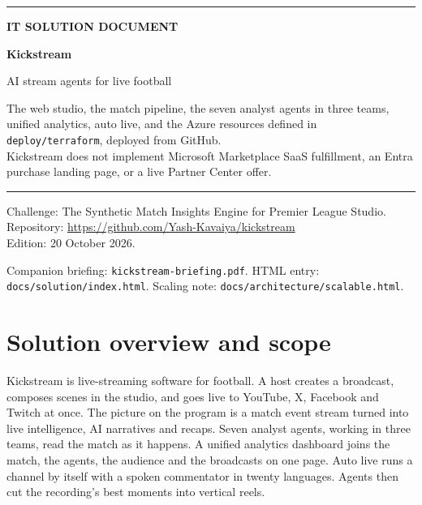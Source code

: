 \documentclass[11pt]{article}
\begin{document}
\begin{titlepage}
\thispagestyle{empty}
{\color{CommBlue}\rule{\textwidth}{4pt}}
\vspace{1.6em}
{\color{CommBlue}\fontsize{12}{16}\selectfont\bfseries IT SOLUTION DOCUMENT\par}
\vspace{0.8em}
{\KickstreamTitleSize\bfseries Kickstream\par}
\vspace{0.4em}
{\fontsize{16}{22}\selectfont AI stream agents for live football\par}
\vspace{1.2em}
\color{Muted}
The web studio, the match pipeline, the seven analyst agents in three teams,
unified analytics, auto live, and the Azure resources defined in
\texttt{deploy/terraform}, deployed from GitHub.\\[0.4em]
Kickstream does not implement Microsoft Marketplace SaaS fulfillment,
an Entra purchase landing page, or a live Partner Center offer.\par
\vspace{1.4em}
{\color{CommBlue}\rule{48pt}{3pt}\par}
\vspace{1.4em}
{\small Challenge: The Synthetic Match Insights Engine for Premier League Studio.\\
Repository: \url{https://github.com/Yash-Kavaiya/kickstream}\\
Edition: 20 October 2026.\par}
\vfill
{\small\color{Muted} Companion briefing: \texttt{kickstream-briefing.pdf}.
HTML entry: \texttt{docs/solution/index.html}.
Scaling note: \texttt{docs/architecture/scalable.html}.\par}
\end{titlepage}

\tableofcontents
\vspace{1em}

\section{Solution overview and scope}

Kickstream is live-streaming software for football.
A host creates a broadcast, composes scenes in the studio, and goes live to
YouTube, X, Facebook and Twitch at once.
The picture on the program is a match event stream turned into live intelligence,
AI narratives and recaps.
Seven analyst agents, working in three teams, read the match as it happens.
A unified analytics dashboard joins the match, the agents, the audience and the
broadcasts on one page.
Auto live runs a channel by itself with a spoken commentator in twenty languages.
Agents then cut the recording's best moments into vertical reels.
\end{document}
